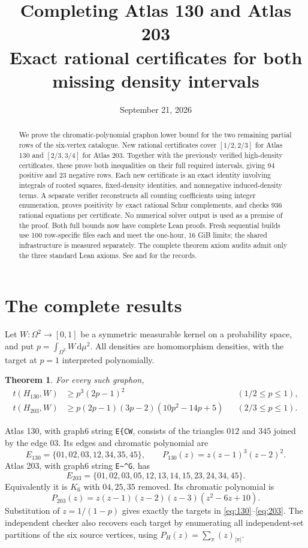 \documentclass[11pt]{article}
\title{Completing Atlas 130 and Atlas 203\\
\large Exact rational certificates for both missing density intervals}
\author{}
\date{September 21, 2026}
\newtheorem{theorem}{Theorem}
\newcommand{\dd}{\,\mathrm d}
\begin{document}
\maketitle

\begin{abstract}
We prove the chromatic-polynomial graphon lower bound for the two remaining
partial rows of the six-vertex catalogue.  New rational certificates cover
$[1/2,2/3]$ for Atlas 130 and $[2/3,3/4]$ for Atlas 203.  Together with the
previously verified high-density certificates, these prove both inequalities
on their full required intervals, giving 94 positive and 23 negative rows.
Each new certificate is an exact identity involving integrals of rooted
squares, fixed-density identities, and nonnegative induced-density terms.
A separate verifier reconstructs all counting coefficients using integer
enumeration, proves positivity by exact rational Schur complements, and checks
936 rational equations per certificate.  No numerical solver output is used
as a premise of the proof.  Both full bounds now have complete Lean proofs. Fresh sequential builds
use 100 row-specific files each and meet the one-hour, 16 GiB limits;
the shared infrastructure is measured separately. The complete theorem
axiom audits admit only the three standard Lean axioms. See
 and
 for the records.
\end{abstract}

\section{The complete results}

Let $W\colon\Omega^2\to[0,1]$ be a symmetric measurable kernel on a
probability space, and put $p=\int_{\Omega^2}W\dd\mu^2$.  All densities are
homomorphism densities, with the target at $p=1$ interpreted polynomially.

\begin{theorem}\label{thm:complete}
For every such graphon,
\begin{align}
 t(H_{130},W)&\ge p^3(2p-1)^2 &&(1/2\le p\le1),\label{eq:130}\\
 t(H_{203},W)&\ge p(2p-1)(3p-2)(10p^2-14p+5)
       &&(2/3\le p\le1).\label{eq:203}
\end{align}
\end{theorem}

Atlas 130, with graph6 string \verb|E{CW|, consists of the triangles $012$
and $345$ joined by the edge $03$.  Its edges and chromatic polynomial are
\[
 E_{130}=\{01,02,03,12,34,35,45\},\qquad
 P_{130}(z)=z(z-1)^3(z-2)^2.
\]
Atlas 203, with graph6 string \verb|E~^G|, has
\[
 E_{203}=\{01,02,03,05,12,13,14,15,23,24,34,45\}.
\]
Equivalently it is $K_6$ with $04,25,35$ removed.  Its chromatic polynomial is
\[
 P_{203}(z)=z(z-1)(z-2)(z-3)(z^2-6z+10).
\]
Substitution of $z=1/(1-p)$ gives exactly the targets in
\eqref{eq:130}--\eqref{eq:203}.  The independent checker also recovers each
target by enumerating all independent-set partitions of the six source
vertices, using $P_H(z)=\sum_\pi(z)_{|\pi|}$.
\end{document}

